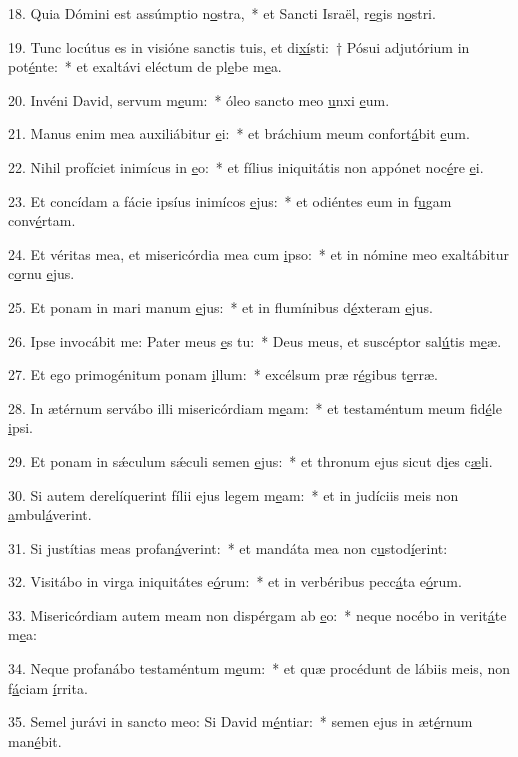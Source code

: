 18. Quia Dómini est assúmptio n\uline{o}stra,~* et Sancti Israël, r\uline{e}gis n\uline{o}stri.\par 
19. Tunc locútus es in visióne sanctis tuis, et di\uline{xí}sti:~† Pósui adjutórium in pot\uline{é}nte:~* et exaltávi eléctum de pl\uline{e}be m\uline{e}a.\par 
20. Invéni David, servum m\uline{e}um:~* óleo sancto meo \uline{u}nxi \uline{e}um.\par 
21. Manus enim mea auxiliábitur \uline{e}i:~* et bráchium meum confort\uline{á}bit \uline{e}um.\par 
22. Nihil profíciet inimícus in \uline{e}o:~* et fílius iniquitátis non appónet noc\uline{é}re \uline{e}i.\par 
23. Et concídam a fácie ipsíus inimícos \uline{e}jus:~* et odiéntes eum in f\uline{u}gam conv\uline{é}rtam.\par 
24. Et véritas mea, et misericórdia mea cum \uline{i}pso:~* et in nómine meo exaltábitur c\uline{o}rnu \uline{e}jus.\par 
25. Et ponam in mari manum \uline{e}jus:~* et in flumínibus d\uline{é}xteram \uline{e}jus.\par 
26. Ipse invocábit me: Pater meus \uline{e}s tu:~* Deus meus, et suscéptor sal\uline{ú}tis m\uline{e}æ.\par 
27. Et ego primogénitum ponam \uline{i}llum:~* excélsum præ r\uline{é}gibus t\uline{e}rræ.\par 
28. In ætérnum servábo illi misericórdiam m\uline{e}am:~* et testaméntum meum fid\uline{é}le \uline{i}psi.\par 
29. Et ponam in sǽculum sǽculi semen \uline{e}jus:~* et thronum ejus sicut d\uline{i}es c\uline{æ}li.\par 
30. Si autem derelíquerint fílii ejus legem m\uline{e}am:~* et in judíciis meis non \uline{a}mbul\uline{á}verint.\par 
31. Si justítias meas profan\uline{á}verint:~* et mandáta mea non c\uline{u}stod\uline{í}erint:\par 
32. Visitábo in virga iniquitátes e\uline{ó}rum:~* et in verbéribus pecc\uline{á}ta e\uline{ó}rum.\par 
33. Misericórdiam autem meam non dispérgam ab \uline{e}o:~* neque nocébo in verit\uline{á}te m\uline{e}a:\par 
34. Neque profanábo testaméntum m\uline{e}um:~* et quæ procédunt de lábiis meis, non f\uline{á}ciam \uline{í}rrita.\par 
35. Semel jurávi in sancto meo: Si David m\uline{é}ntiar:~* semen ejus in æt\uline{é}rnum man\uline{é}bit.\par 

